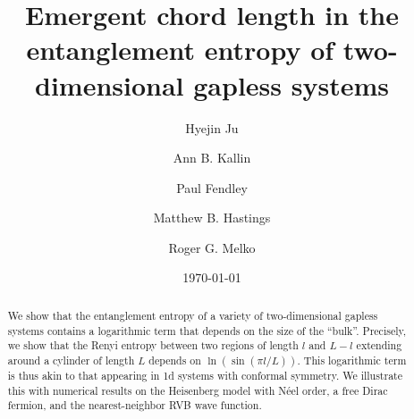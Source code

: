 \documentclass[prl,aps,twocolumn,floatfix,amsmath,amssymb,superscriptaddress,tightenlines]{revtex4}
\begin{document}
\date{\today}
\title{Emergent chord length in the entanglement entropy of
  two-dimensional gapless systems}

\author{Hyejin Ju}

\author{Ann B. Kallin}

\author{Paul Fendley}

\author{Matthew B. Hastings}

\author{Roger G. Melko}

\begin{abstract} 
We show that the entanglement entropy of a variety of two-dimensional
gapless systems contains a logarithmic term that depends on the size
of the ``bulk''. Precisely, we show that the Renyi entropy between two
regions of length $l$ and $L-l$ extending around a cylinder of length
$L$ depends on $\ln(\sin(\pi l/L))$. This logarithmic term is thus
akin to that appearing in 1d systems with conformal symmetry. We
illustrate this with numerical results on the Heisenberg model with
N\'eel order, a free Dirac fermion, and the nearest-neighbor RVB wave
function.


 
\end{abstract}
\maketitle
\end{document}
